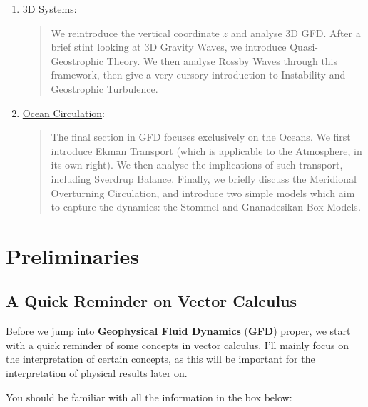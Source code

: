 \begin{enumerate}
    \item \hyperref[3D Systems]{3D Systems}:
        
        \begin{quote}
            We reintroduce the vertical coordinate $z$ and analyse 3D GFD. After a brief stint looking at 3D Gravity Waves, we introduce Quasi-Geostrophic Theory. We then analyse Rossby Waves through this framework, then give a very cursory introduction to Instability and Geostrophic Turbulence.
        \end{quote}

    \item \hyperref[Oceans]{Ocean Circulation}:
        
        \begin{quote}
            The final section in GFD focuses exclusively on the Oceans. We first introduce Ekman Transport (which is applicable to the Atmosphere, in its own right). We then analyse the implications of such transport, including Sverdrup Balance. Finally, we briefly discuss the Meridional Overturning Circulation, and introduce two simple models which aim to capture the dynamics: the Stommel and Gnanadesikan Box Models.
        \end{quote}
\end{enumerate}

\chapter{Preliminaries}\label{Prelim GFD}

\section{A Quick Reminder on Vector Calculus}

Before we jump into \textbf{Geophysical Fluid Dynamics} (\textbf{GFD}) proper, we start with a quick reminder of some concepts in vector calculus. I'll mainly focus on the interpretation of certain concepts, as this will be important for the interpretation of physical results later on.

You should be familiar with all the information in the box below:

